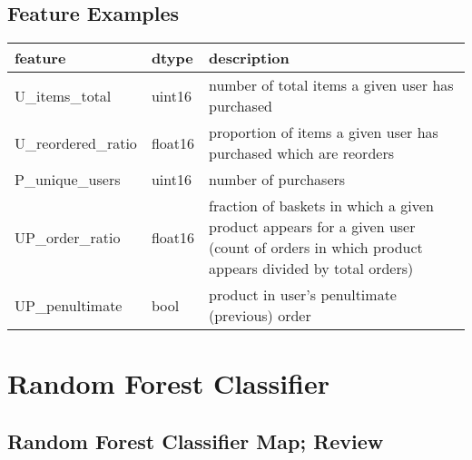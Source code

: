 \documentclass[handout]{beamer}
\begin{document}
\subsection{Feature Examples}

\begin{frame}

\begin{center}
\begin{tabular}{>{\ttfamily}l>{\ttfamily}lp{4cm}} \toprule
  \textsf{feature}                                  & \textsf{dtype}                                     & description  \\ \midrule
   U\_items\_total                        &                        uint16           & number of total items a given user has purchased\\ \hline
    U\_reordered\_ratio                    &                    float16              & proportion of items a given user has purchased which are reorders\\ \hline
       P\_unique\_users                       &                       uint16            & number of purchasers\\ \hline
    UP\_order\_ratio                       &                       float16           & fraction of baskets in which a given product appears for a given user (count of orders in which product appears divided by total orders) \\ \hline
    UP\_penultimate                        &                       bool              & product in user's penultimate (previous) order\\                                                                                                                                                                                                                                                                                                                
   \bottomrule
\end{tabular}
\end{center}

\end{frame}



\section%
{Random Forest Classifier}

\subsection{Random Forest Classifier Map; Review}
\end{document}
